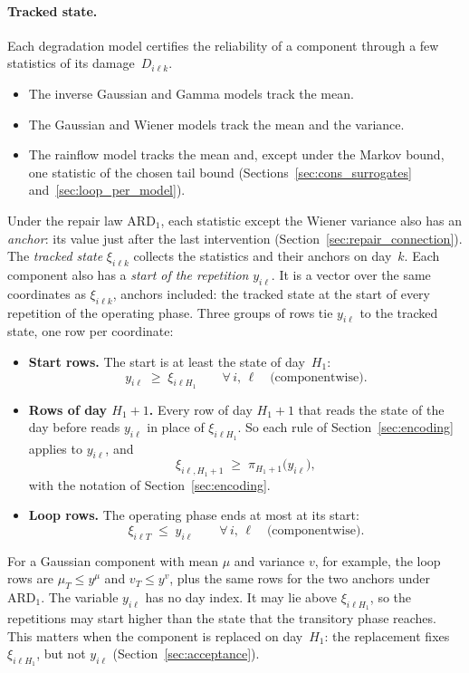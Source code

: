 \documentclass[11pt,a4paper]{article}
\theoremstyle{plain}
\theoremstyle{definition}
\theoremstyle{remark}
\begin{document}
\paragraph{Tracked state.}
Each degradation model certifies the reliability of a component through a few statistics of its damage~$D_{i\ell k}$.
\begin{itemize}
  \item The inverse Gaussian and Gamma models track the mean.
  \item The Gaussian and Wiener models track the mean and the variance.
  \item The rainflow model tracks the mean and, except under the Markov bound, one statistic of the chosen tail bound (Sections~\ref{sec:cons_surrogates} and~\ref{sec:loop_per_model}).
\end{itemize}
Under the repair law $\text{ARD}_1$, each statistic except the Wiener variance also has an \emph{anchor}: its value just after the last intervention (Section~\ref{sec:repair_connection}).
The \emph{tracked state} $\xi_{i\ell k}$ collects the statistics and their anchors on day~$k$.
Each component also has a \emph{start of the repetition} $y_{i\ell}$.
It is a vector over the same coordinates as $\xi_{i\ell k}$, anchors included: the tracked state at the start of every repetition of the operating phase.
Three groups of rows tie $y_{i\ell}$ to the tracked state, one row per coordinate:
\begin{itemize}
  \item \textbf{Start rows.} The start is at least the state of day~$H_1$:
    \begin{equation}\label{eq:start}
      y_{i\ell} \;\ge\; \xi_{i\ell H_1}
      \qquad \forall\, i,\,\ell \quad \text{(componentwise)}.
    \end{equation}
  \item \textbf{Rows of day $H_1 + 1$.} Every row of day $H_1 + 1$ that reads the state of the day before reads $y_{i\ell}$ in place of $\xi_{i\ell H_1}$.
    So each rule of Section~\ref{sec:encoding} applies to $y_{i\ell}$, and
    \begin{equation}\label{eq:start_day}
      \xi_{i\ell,H_1+1} \;\ge\; \pi_{H_1+1}\bigl(y_{i\ell}\bigr),
    \end{equation}
    with the notation of Section~\ref{sec:encoding}.
  \item \textbf{Loop rows.} The operating phase ends at most at its start:
    \begin{equation}\label{eq:loop}
      \xi_{i\ell T} \;\le\; y_{i\ell}
      \qquad \forall\, i,\,\ell \quad \text{(componentwise)}.
    \end{equation}
\end{itemize}
For a Gaussian component with mean $\mu$ and variance $v$, for example, the loop rows are $\mu_T \le y^{\mu}$ and $v_T \le y^{v}$, plus the same rows for the two anchors under $\text{ARD}_1$.
The variable $y_{i\ell}$ has no day index.
It may lie above $\xi_{i\ell H_1}$, so the repetitions may start higher than the state that the transitory phase reaches.
This matters when the component is replaced on day~$H_1$: the replacement fixes $\xi_{i\ell H_1}$, but not $y_{i\ell}$ (Section~\ref{sec:acceptance}).
\end{document}
